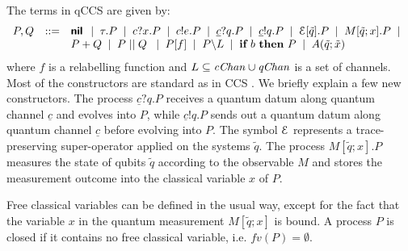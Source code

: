 \documentclass[a4paper,UKenglish,cleveref, autoref]{lipics-v2019}
\newcommand{\qc}{\underline{c}}
\newcommand{\cChan}{{\it cChan}}
\newcommand{\qChan}{{\it qChan}}
\newcommand{\CE}{{\cal E}}
\newcommand{\ifthen}[2]{{\textbf{if} ~#1~ \textbf{then} ~#2}}
\begin{document}
The terms in qCCS are given by:
\[\begin{array}{rcl}
P,Q &::=& \Cnil \BNFsep \tau.P \BNFsep c?x.P \BNFsep c!e.P
\BNFsep \qc?q.P \BNFsep
\qc!q.P \BNFsep \CE[\tilde{q}].P
\BNFsep M[\tilde{q};x].P \BNFsep \\
& & P + Q \BNFsep  P \Cpar Q\;
\BNFsep P[f] \BNFsep P\backslash L \BNFsep \ifthen{b}{P} \BNFsep
A(\tilde{q};\tilde{x})
\end{array}\]
where $f$ is a relabelling function and $L\subseteq \cChan\cup \qChan$ is a set of channels.
Most of the constructors are standard as in CCS \cite{ccs}.
We briefly explain a few new constructors. The process $\qc?q.P$ receives a quantum datum along quantum channel $\qc$ and evolves into $P$, while $\qc!q.P$ sends out a quantum datum along quantum channel $\qc$ before evolving into $P$. The symbol $\CE$ represents a trace-preserving super-operator applied on the systems $\tilde{q}$. The process $M[\widetilde{q};x].P$ measures the state of qubits $\widetilde{q}$
according to the observable $M$ and stores the measurement outcome into the
classical variable $x$ of $P$.

Free classical variables can be defined in the usual way, except for the fact that the variable $x$ in the quantum measurement $M[\tilde{q};x]$ is bound. A process $P$ is closed if it contains no free classical variable, i.e. $fv(P)=\emptyset$.
\end{document}
